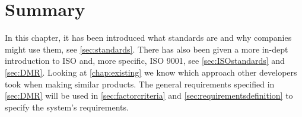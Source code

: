 \section{Summary}
In this chapter, it has been introduced what standards are and why companies might use them, see \cref{sec:standards}.
There has also been given a more in-dept introduction to ISO and, more specific, ISO 9001, see \cref{sec:ISOstandards} and \cref{sec:DMR}.
Looking at \ref{chap:existing} we know which approach other developers took when making similar products.
The general requirements specified in \cref{sec:DMR} will be used in \cref{sec:factorcriteria} and \cref{sec:requirementsdefinition} to specify the system's requirements.

